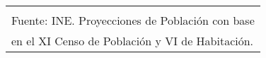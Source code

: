 {\begin{center}
\begin{tabular}{lrr}
\hline
&&\\[-0.36cm]
\multicolumn{3}{l}{\footnotesize Fuente:  INE. Proyecciones de Población con base }\\
\multicolumn{3}{l}{\footnotesize  en el XI Censo de Población y VI de Habitación.}\\[-0.36cm]
\end{tabular}\\[1.8cm]\addtocounter{Cuadro}{1}
\end{center}
}



